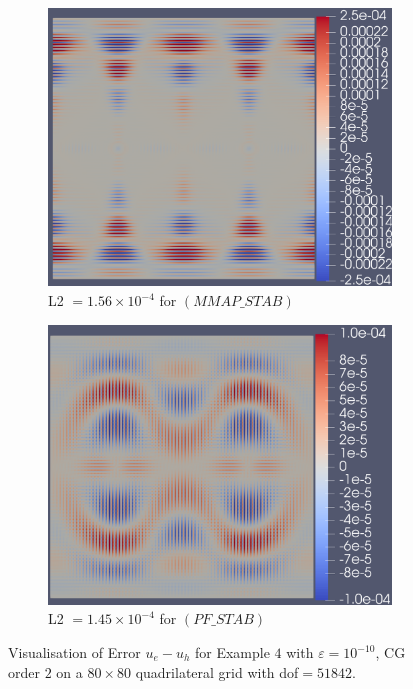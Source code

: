 \documentclass[12pt]{ociamthesis}
\begin{document}
\begin{figure}[H]
 \begin{subfigure}{0.5\textwidth}
     \includegraphics[width=\textwidth]{Pics/ErrorPlots/E4_MMAP_STAB.png}
     \caption{L2 $=1.56\times10^{-4}$ for $(MMAP\_STAB)$}
 \end{subfigure}
   \begin{subfigure}{0.5\textwidth}
     \includegraphics[width=\textwidth]{Pics/ErrorPlots/E4_PF_STAB.png}
     \caption{L2 $=1.45\times10^{-4}$ for $(PF\_STAB)$}
 \end{subfigure}
 \caption{Visualisation of Error $u_e-u_h$ for Example $4$ with $\varepsilon = 10^{-10}$, CG order $2$ on a $80 \times 80$ quadrilateral grid with dof$=51842$.} \label{E4_Error}
\end{figure}
\end{document}
